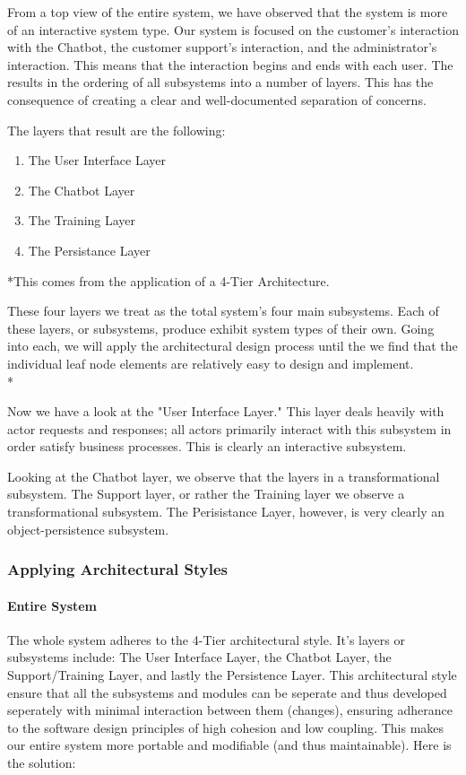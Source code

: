 \documentclass[11pt]{article}
\begin{document}
From a top view of the entire system, we have observed that the system is more of an interactive system type. Our system is focused on the customer's interaction with the Chatbot, the customer support's interaction, and the administrator's interaction. This means that the interaction begins and ends with each user. The results in the ordering of all subsystems into a number of layers. This has the consequence of creating a clear and well-documented separation of concerns\cite{Book:2}. 

The layers that result are the following:
\begin{enumerate}
	\item The User Interface Layer
	\item The Chatbot Layer
	\item The Training Layer
	\item The Persistance Layer
\end{enumerate}
*This comes from the application of a 4-Tier Architecture.

These four layers we treat as the total system's four main subsystems. Each of these layers, or subsystems, produce exhibit system types of their own. Going into each, we will apply the architectural design process until the we find that the individual leaf node elements are relatively easy to design and implement\cite{Book:1}. \\*

Now we have a look at the "User Interface Layer." This layer deals heavily with actor requests and responses; all actors primarily interact with this subsystem in order satisfy business processes. This is clearly an interactive subsystem.\par

Looking at the Chatbot layer, we observe that the layers in a transformational subsystem. The Support layer, or rather the Training layer we observe a transformational subsystem. The Perisistance Layer, however, is very clearly an object-persistence subsystem.

\subsubsection{Applying Architectural Styles}

\paragraph{Entire System}
The whole system adheres to the 4-Tier architectural style. It's layers or subsystems include: The User Interface Layer, the Chatbot Layer, the Support/Training Layer, and lastly the Persistence Layer. This architectural style ensure that all the subsystems and modules can be seperate and thus developed seperately with minimal interaction between them (changes), ensuring adherance to the software design principles of high cohesion and low coupling\cite{Book:2}. This makes our entire system more portable and modifiable (and thus maintainable). Here is the solution:
\end{document}
